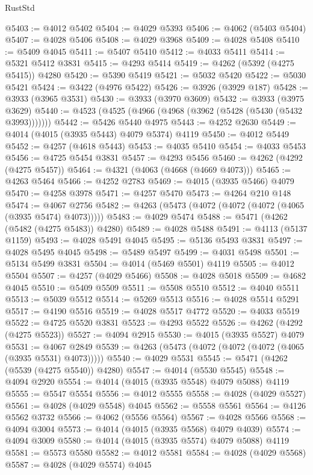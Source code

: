 \begin{lexlean}{RustStd}
\begin{coremodule}
@5403 := @4012 @5402
@5404 := @4029 @5393
@5406 := @4062 (@5403 @5404)
@5407 := @4028 @5406
@5408 := @4029 @3968
@5409 := @4028 @5408
@5410 := @5409 @4045
@5411 := @5407 @5410
@5412 := @4033 @5411
@5414 := @5321 @5412 @3831
@5415 := @4293 @5414
@5419 := @4262 (@5392 (@4275 @5415)) @4280
@5420 := @5390 @5419
@5421 := @5032 @5420
@5422 := @5030 @5421
@5424 := @3422 (@4976 @5422)
@5426 := @3926 (@3929 @187)
@5428 := @3933 (@3965 @3531)
@5430 := @3933 (@3970 @3609)
@5432 := @3933 (@3975 @3629)
@5440 := @4523 (@4525 (@4966 (@4968 (@3962 (@5428 (@5430 (@5432 @3993)))))))
@5442 := @5426 @5440 @4975
@5443 := @4252 @2630
@5449 := @4014 (@4015 (@3935 @5443) @4079 @5374) @4119
@5450 := @4012 @5449
@5452 := @4257 (@4618 @5443)
@5453 := @4035 @5410
@5454 := @4033 @5453
@5456 := @4725 @5454 @3831
@5457 := @4293 @5456
@5460 := @4262 (@4292 (@4275 @5457))
@5464 := @4321 (@4063 (@4668 (@4669 @4073)))
@5465 := @4263 @5464
@5466 := @4252 @2783
@5469 := @4015 (@3935 @5466) @4079
@5470 := @4258 @3978
@5471 := @4257 @5470
@5473 := @4264 @210 @148
@5474 := @4067 @2756
@5482 := @4263 (@5473 (@4072 (@4072 (@4072 (@4065 (@3935 @5474) @4073)))))
@5483 := @4029 @5474
@5488 := @5471 (@4262 (@5482 (@4275 @5483)) @4280)
@5489 := @4028 @5488
@5491 := @4113 (@5137 @1159)
@5493 := @4028 @5491 @4045
@5495 := @5136 @5493 @3831
@5497 := @4028 @5495 @4045
@5498 := @5489 @5497
@5499 := @4031 @5498
@5501 := @5134 @5499 @3831
@5504 := @4014 (@5469 @5501) @4119
@5505 := @4012 @5504
@5507 := @4257 (@4029 @5466)
@5508 := @4028 @5018
@5509 := @4682 @4045
@5510 := @5409 @5509
@5511 := @5508 @5510
@5512 := @4040 @5511
@5513 := @5039 @5512
@5514 := @5269 @5513
@5516 := @4028 @5514 @5291
@5517 := @4190 @5516
@5519 := @4028 @5517 @4772
@5520 := @4033 @5519
@5522 := @4725 @5520 @3831
@5523 := @4293 @5522
@5526 := @4262 (@4292 (@4275 @5523))
@5527 := @4094 @2915
@5530 := @4015 (@3935 @5527) @4079
@5531 := @4067 @2849
@5539 := @4263 (@5473 (@4072 (@4072 (@4072 (@4065 (@3935 @5531) @4073)))))
@5540 := @4029 @5531
@5545 := @5471 (@4262 (@5539 (@4275 @5540)) @4280)
@5547 := @4014 (@5530 @5545)
@5548 := @4094 @2920
@5554 := @4014 (@4015 (@3935 @5548) @4079 @5088) @4119
@5555 := @5547 @5554
@5556 := @4012 @5555
@5558 := @4028 (@4029 @5527)
@5561 := @4028 (@4029 @5548) @4045
@5562 := @5558 @5561
@5564 := @4126 @5562 @3732
@5566 := @4062 (@5556 @5564)
@5567 := @4028 @5566
@5568 := @4094 @3004
@5573 := @4014 (@4015 (@3935 @5568) @4079 @4039)
@5574 := @4094 @3009
@5580 := @4014 (@4015 (@3935 @5574) @4079 @5088) @4119
@5581 := @5573 @5580
@5582 := @4012 @5581
@5584 := @4028 (@4029 @5568)
@5587 := @4028 (@4029 @5574) @4045

\end{coremodule}
\end{lexlean}
